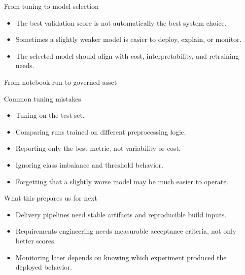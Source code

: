 \begin{frame}{From tuning to model selection}
\begin{itemize}
\item The best validation score is not automatically the best system choice.
\item Sometimes a slightly weaker model is easier to deploy, explain, or monitor.
\item The selected model should align with cost, interpretability, and retraining needs.
\end{itemize}
\coursefooter
\end{frame}

\begin{frame}{From notebook run to governed asset}
\centering
{}
\coursefooter
\end{frame}

\begin{frame}{Common tuning mistakes}
\begin{itemize}
\item Tuning on the test set.
\item Comparing runs trained on different preprocessing logic.
\item Reporting only the best metric, not variability or cost.
\item Ignoring class imbalance and threshold behavior.
\item Forgetting that a slightly worse model may be much easier to operate.
\end{itemize}
\coursefooter
\end{frame}

\begin{frame}{What this prepares us for next}
\begin{itemize}
\item Delivery pipelines need stable artifacts and reproducible build inputs.
\item Requirements engineering needs measurable acceptance criteria, not only better scores.
\item Monitoring later depends on knowing which experiment produced the deployed behavior.
\end{itemize}
\coursefooter
\end{frame}

